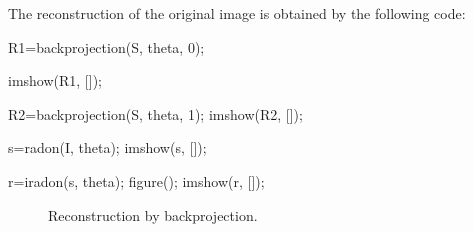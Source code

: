 The reconstruction of the original image is obtained by the following code:
\begin{matlab}
R1=backprojection(S, theta, 0);

imshow(R1, []);

R2=backprojection(S, theta, 1);
imshow(R2, []);

s=radon(I, theta);
imshow(s, []);

r=iradon(s, theta);
figure();
imshow(r, []); 
\end{matlab}

\begin{figure}[htbp]
 \centering
 
 \hfill
  \hfill
 \caption{Reconstruction by backprojection.}
 \label{fig:tomography:matlab:backprojection}
\end{figure}

